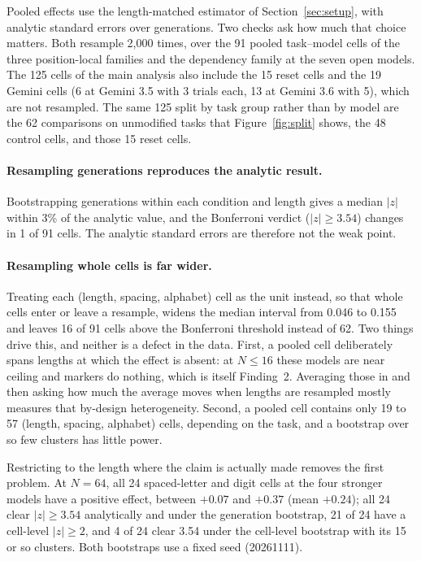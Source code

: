 \documentclass[10pt]{article} %
\begin{document}
Pooled effects use the length-matched estimator of Section~\ref{sec:setup}, with analytic
standard errors over generations. Two checks ask how much that choice matters. Both resample 2{,}000 times,
over the 91 pooled task--model cells of the three position-local families and the dependency family at the seven open models. The 125 cells of the main analysis also include the 15 reset cells and the 19 Gemini cells (6 at Gemini 3.5 with 3 trials each, 13 at Gemini 3.6 with 5), which are not resampled. The same 125 split by task group rather than by model are the 62 comparisons on unmodified tasks that Figure~\ref{fig:split} shows, the 48 control cells, and those 15 reset cells.

\paragraph{Resampling generations reproduces the analytic result.} Bootstrapping generations
within each condition and length gives a median $|z|$ within 3\% of the analytic value, and the
Bonferroni verdict ($|z| \ge 3.54$) changes in 1 of 91 cells. The analytic standard errors are
therefore not the weak point.

\paragraph{Resampling whole cells is far wider.} Treating each (length, spacing, alphabet) cell
as the unit instead, so that whole cells enter or leave a resample, widens the median interval
from 0.046 to 0.155 and leaves 16 of 91 cells above the Bonferroni threshold instead of 62. Two
things drive this, and neither is a defect in the data. First, a pooled cell deliberately spans
lengths at which the effect is absent: at $N \le 16$ these models are near ceiling and markers
do nothing, which is itself Finding~2. Averaging those in and then asking how much the average
moves when lengths are resampled mostly measures that by-design heterogeneity. Second, a pooled
cell contains only 19 to 57 (length, spacing, alphabet) cells, depending on the task, and a bootstrap over so few
clusters has little power.

Restricting to the length where the claim is actually made removes the first problem. At
$N = 64$, all 24 spaced-letter and digit cells at the four stronger models have a positive
effect, between $+0.07$ and $+0.37$ (mean $+0.24$); all 24 clear $|z| \ge 3.54$ analytically and
under the generation bootstrap, 21 of 24 have a cell-level $|z| \ge 2$, and 4 of 24 clear 3.54
under the cell-level bootstrap with its 15 or so clusters. Both bootstraps use a fixed seed (20261111).
\end{document}
